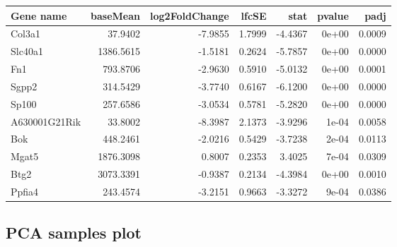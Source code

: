 \documentclass[]{article}
\begin{document}
\begin{table}[H]
\centering
\begin{tabular}{lrrrrrr}
\toprule
Gene name & baseMean & log2FoldChange & lfcSE & stat & pvalue & padj\\
\midrule
\rowcolor{gray!6}  Col3a1 & 37.9402 & -7.9855 & 1.7999 & -4.4367 & 0e+00 & 0.0009\\
Slc40a1 & 1386.5615 & -1.5181 & 0.2624 & -5.7857 & 0e+00 & 0.0000\\
\rowcolor{gray!6}  Fn1 & 793.8706 & -2.9630 & 0.5910 & -5.0132 & 0e+00 & 0.0001\\
Sgpp2 & 314.5429 & -3.7740 & 0.6167 & -6.1200 & 0e+00 & 0.0000\\
\rowcolor{gray!6}  Sp100 & 257.6586 & -3.0534 & 0.5781 & -5.2820 & 0e+00 & 0.0000\\
\addlinespace
A630001G21Rik & 33.8002 & -8.3987 & 2.1373 & -3.9296 & 1e-04 & 0.0058\\
\rowcolor{gray!6}  Bok & 448.2461 & -2.0216 & 0.5429 & -3.7238 & 2e-04 & 0.0113\\
Mgat5 & 1876.3098 & 0.8007 & 0.2353 & 3.4025 & 7e-04 & 0.0309\\
\rowcolor{gray!6}  Btg2 & 3073.3391 & -0.9387 & 0.2134 & -4.3984 & 0e+00 & 0.0010\\
Ppfia4 & 243.4574 & -3.2151 & 0.9663 & -3.3272 & 9e-04 & 0.0386\\
\bottomrule
\end{tabular}
\end{table}

\hypertarget{pca-samples-plot}{%
\subsection{PCA samples plot}\label{pca-samples-plot}}
\end{document}
